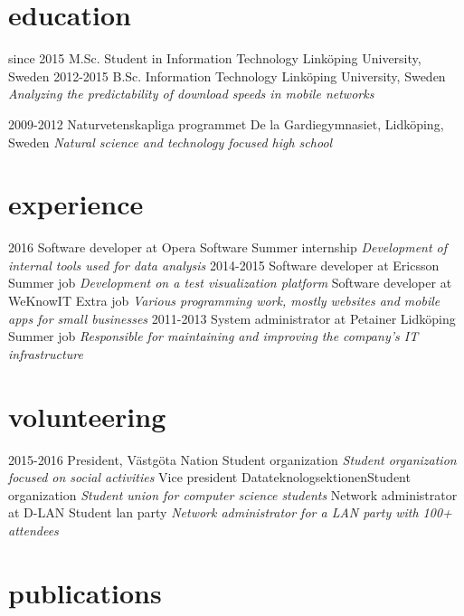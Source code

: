 \documentclass[]{friggeri-cv}
\begin{document}
\section{education}

\begin{entrylist}
  \entry
    {since 2015}
    {M.Sc. Student in Information Technology}
    {Linköping University, Sweden}
    {}
  \entry
    {2012-2015}
    {B.Sc. Information Technology}
    {Linköping University, Sweden}
    {\emph{Analyzing the predictability of download speeds in mobile networks}}

  \entry
    {2009-2012}
    {Naturvetenskapliga programmet}
    {De la Gardiegymnasiet, Lidköping, Sweden}
    {\emph{Natural science and technology focused high school}}
\end{entrylist}

\section{experience}
\begin{entrylist}
  \entry
  {2016}
  {Software developer at Opera Software}
  {Summer internship}
  {\emph{Development of internal tools used for data analysis}}
  \entry
  {2014-2015}
  {Software developer at Ericsson}
  {Summer job}
  {\emph{Development on a test visualization platform}}
  {Software developer at WeKnowIT}
  {Extra job}
  {\emph{Various programming work, mostly websites and mobile apps for small
  businesses}}
  \entry
  {2011-2013}
  {System administrator at Petainer Lidköping}
  {Summer job}
  {\emph{Responsible for maintaining and improving the company's IT infrastructure}}
 

\end{entrylist}
\section{volunteering}
\begin{entrylist}
\entry
    {2015-2016}
    {President, Västgöta Nation}
    {Student organization}
    {\emph{Student organization focused on social activities}}
  {Vice president Datateknologsektionen}{Student organization}
  {\emph{Student union for computer science students}}
  {Network administrator at D-LAN}
  {Student lan party}
  {\emph{Network administrator for a LAN party with 100+ attendees}}
\end{entrylist}
	\section{publications}
\end{document}
